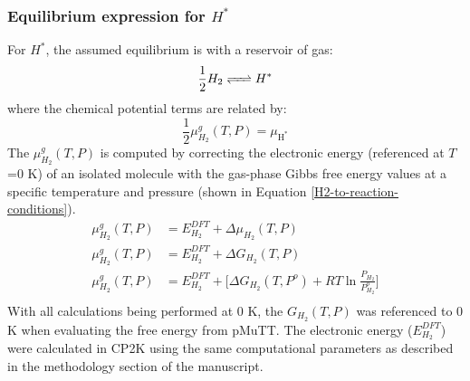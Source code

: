 \documentclass[12pt]{article}
\begin{document}
\subsubsection{Equilibrium expression for $H^{*}$}
For $H^{*}$, the assumed equilibrium is with a reservoir of  gas:
\begin{equation}
    \frac{1}{2} H_{2} \ce{<=>} H^{*}
\end{equation}
where the chemical potential terms are related by: 
\begin{equation}
    \frac{1}{2} \mu_{H_{2}}^{g}(T,P) = \mu_{\text{H}^{*}}
\end{equation}  
The $\mu_{H_{2}}^{g}(T,P)$ is computed by  correcting the electronic energy (referenced at $T$=0 K) of an isolated molecule with the gas-phase Gibbs free energy values at a specific temperature and pressure (shown in Equation \ref{H2-to-reaction-conditions}). 
\begin{equation}
    \begin{split}
         \mu_{H_{2}}^{g}(T,P) &= E_{H_{2}}^{DFT} + \Delta \mu_{H_{2}}(T,P)  \\
         \mu_{H_{2}}^{g}(T,P) &= E_{H_{2}}^{DFT} + \Delta G_{H_{2}}(T,P) \\ 
         \mu_{H_{2}}^{g}(T,P) &= E_{H_{2}}^{DFT} + \Big[ \Delta G_{H_{2}}(T,P^{o})  + RT \ln{ \frac{P_{H_2}}{P_{H_2}^{o}}} \Big]  \\ 
    \end{split}
    \label{H2-to-reaction-conditions}
\end{equation}
With all calculations being performed at 0 K, the $G_{H_{2}}(T,P)$ was referenced to 0 K when evaluating the free energy from pMuTT. The electronic energy ($E_{H_{2}}^{DFT}$) were calculated in CP2K using the same computational parameters as described in the methodology section of the manuscript. 
\end{document}
